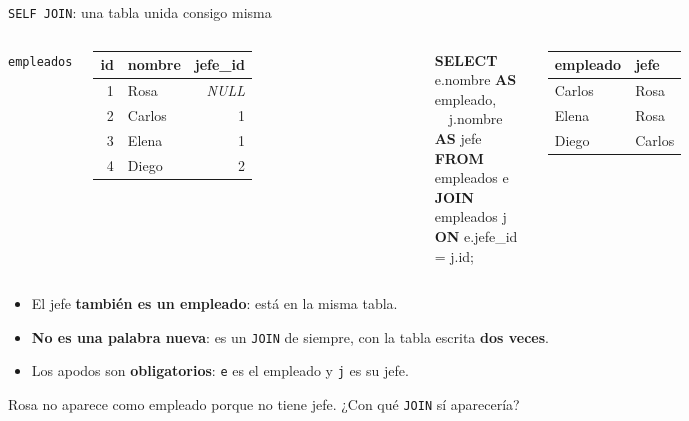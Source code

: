 \documentclass[aspectratio=169,10pt,c]{beamer}
\newcommand{\tbl}[1]{\textcolor{utpNaranja}{\texttt{#1}}}
\newcommand{\kw}[1]{\textcolor{utpRojo}{\textbf{#1}}}
\newcommand{\nuevo}[1]{{%
  \setlength{\fboxsep}{1.2pt}%
  \begingroup
  \renewcommand{\kw}[1]{\textcolor{utpNegro}{\textbf{##1}}}%
  \colorbox{yellow!45}{\textcolor{utpNegro}{#1}}%
  \endgroup}}
\newcommand{\nulo}{\textcolor{utpGrisMedio}{\textit{NULL}}}
\newenvironment{sqlcode}[1][.86\textwidth]
  {\begin{center}\begin{lrbox}{\sqlbuf}\begin{minipage}{#1}\ttfamily\footnotesize\vspace{6pt}\raggedright}
  {\vspace{6pt}\end{minipage}\end{lrbox}\colorbox{utpGrisClaro}{\usebox{\sqlbuf}}\end{center}}
\newcommand{\ind}{\hspace*{1.6em}}
\begin{document}
\begin{frame}{\texttt{SELF JOIN}: una tabla unida consigo misma}
\begin{columns}[c,onlytextwidth]
\centering\tbl{empleados}\\[4pt]
\scriptsize\ttfamily
\begin{tabular}{rlr}
\toprule
\normalfont\bfseries id & \normalfont\bfseries nombre & \normalfont\bfseries jefe\_id \\
\midrule
1 & Rosa & \nulo \\
2 & Carlos & 1 \\
3 & Elena & 1 \\
4 & Diego & 2 \\
\bottomrule
\end{tabular}
\begin{sqlcode}[\textwidth]
\scriptsize
\kw{SELECT} e.nombre \kw{AS} empleado,\\
\ind\ind\ \ j.nombre \kw{AS} jefe\\
\kw{FROM} empleados \nuevo{e}\\
\kw{JOIN} empleados \nuevo{j} \kw{ON} e.jefe\_id = j.id;
\end{sqlcode}
\centering\scriptsize\ttfamily
\begin{tabular}{ll}
\toprule
\normalfont\bfseries empleado & \normalfont\bfseries jefe \\
\midrule
Carlos & Rosa \\
Elena & Rosa \\
Diego & Carlos \\
\bottomrule
\end{tabular}
\end{columns}
\vspace{0.3cm}
\begin{itemize}\setlength\itemsep{6pt}
  \item El jefe \textbf{también es un empleado}: está en la misma tabla.
  \item \textbf{No es una palabra nueva}: es un \texttt{JOIN} de siempre, con la tabla escrita \textbf{dos veces}.
  \item Los apodos son \textbf{obligatorios}: \texttt{e} es el empleado y \texttt{j} es su jefe.
\end{itemize}
\vspace{0.15cm}
\small Rosa no aparece como empleado porque no tiene jefe. ¿Con qué \texttt{JOIN} sí aparecería?
\end{frame}
\end{document}
